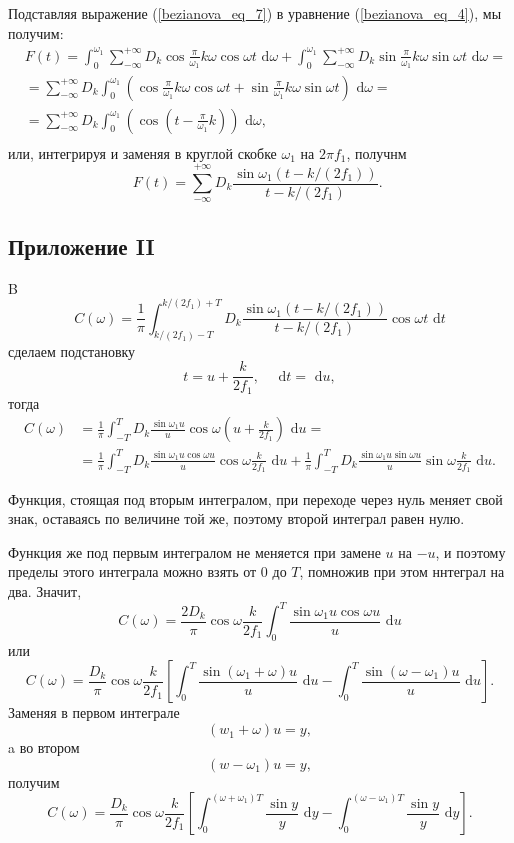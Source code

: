 \qquad Подставляя выражение (\ref{bezianova_eq_7}) в уравнение (\ref{bezianova_eq_4}), мы получим:
$$
\begin{aligned}
& F(t)=\int_0^{\omega_1} \sum_{-\infty}^{+\infty} D_k \cos \frac{\pi}{\omega_1} k \omega \cos \omega t \text{ d} \omega+\int_0^{\omega_1} \sum_{-\infty}^{+\infty} D_k \sin \frac{\pi}{\omega_1} k \omega \sin \omega t \text{ d} \omega= \\
& =\sum_{-\infty}^{+\infty} D_k \int_0^{\omega_1}\left(\cos \frac{\pi}{\omega_1} k \omega \cos \omega t+\sin \frac{\pi}{\omega_1} k \omega \sin \omega t\right) \text{ d} \omega= \\
& =\sum_{-\infty}^{+\infty} D_k \int_0^{\omega_1}\left(\cos \left(t-\frac{\pi}{\omega_1} k\right)\right) \text{ d} \omega, \\
&
\end{aligned}
$$
или, интегрируя и заменяя в круглой скобке $\omega_1$ на $2 \pi f_1$, получнм
$$
F(t)=\sum_{-\infty}^{+\infty} D_k \frac{\sin \omega_1 \left(t-k /\left(2 f_1\right)\right)}{t-k /\left(2 f_1\right)} \text {. }
$$

\subsection*{Приложение II}

\qquad B
$$
C(\omega)=\frac{1}{\pi} \int_{k /\left(2 f_1\right)-T}^{k /\left(2 f_1\right)+T} D_k \frac{\sin \omega_1\left(t-k /\left(2 f_1\right)\right)}{t-k /\left(2 f_1\right)} \cos \omega t \text{ d} t
$$
сделаем подстановку
$$
t=u+\frac{k}{2 f_1}, \quad \text{ d} t = \text{ d} u,
$$
тогда
$$
\begin{aligned}
C(\omega) & =\frac{1}{\pi} \int_{-T}^T D_k \frac{\sin \omega_1 u}{u} \cos \omega\left(u+\frac{k}{2 f_1}\right) \text{ d} u= \\
& =\frac{1}{\pi} \int_{-T}^T D_k \frac{\sin \omega_1 u \cos \omega u}{u} \cos \omega \frac{k}{2 f_1} \text{ d} u+\frac{1}{\pi} \int_{-T}^T D_k \frac{\sin \omega_1 u \sin \omega u}{u} \sin \omega \frac{k}{2 f_1} \text{ d} u .
\end{aligned}
$$

Функция, стоящая под вторым интегралом, при переходе через нуль меняет свой знак, оставаясь по величине той же, поэтому второй интеграл равен нулю.

Функция же под первым интегралом не меняется при замене $u$ на $-u$, и поэтому пределы этого интеграла можно взять от 0 до $T$, помножив при этом ннтеграл на два. Значит,
$$
C(\omega)=\frac{2 D_k}{\pi} \cos \omega \frac{k}{2 f_1} \int_0^T \frac{\sin \omega_1 u \cos \omega u}{u} \text{ d} u
$$
или
$$
C(\omega)=\frac{D_k}{\pi} \cos \omega \frac{k}{2 f_1}\left[\int_0^T \frac{\sin \left(\omega_1+\omega\right) u}{u} \text{ d} u-\int_0^T \frac{\sin \left(\omega-\omega_1\right) u}{u} \text{ d} u\right] .
$$
Заменяя в первом интеграле
$$
\left(w_1+\omega\right) u=y,
$$
a во втором
$$
\left(w-\omega_1\right) u=y,
$$
получим
$$
C(\omega)=\frac{D_k}{\pi} \cos \omega \frac{k}{2 f_1}\left[\int_0^{\left(\omega+\omega_1\right) T} \frac{\sin y}{y} \text{ d} y-\int_0^{\left(\omega-\omega_1\right) T} \frac{\sin y}{y} \text{ d} y\right] .
$$

